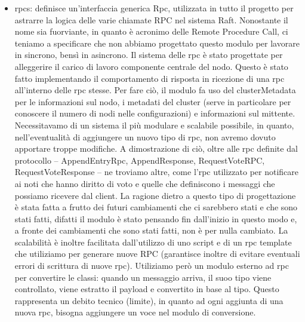 \begin{itemize}
  \item rpcs: definisce un'interfaccia generica Rpc, utilizzata in tutto il progetto per astrarre la logica delle varie chiamate RPC nel sistema Raft. Nonostante il nome sia fuorviante, in quanto è acronimo delle Remote Procedure
    Call, ci teniamo a specificare che non abbiamo progettato questo modulo per lavorare in sincrono, bensì in asincrono.
    Il sistema delle rpc è stato progettate per alleggerire il carico di lavoro
    componente centrale del nodo. Questo è stato fatto implementando il comportamento di risposta in ricezione di una rpc all'interno delle rpc stesse. Per fare ciò, il modulo fa uso del clusterMetadata 
    per le informazioni sul nodo, i metadati del cluster (serve in particolare per conoscere il numero di nodi nelle configurazioni) e informazioni sul mittente. Necessitavamo di un sistema il più modulare e scalabile possibile,
    in quanto,
    nell'eventualità di aggiungere un nuovo tipo di rpc, non avremo dovuto apportare troppe modifiche. A dimostrazione di ciò, oltre alle rpc definite dal protocollo -- AppendEntryRpc, AppendResponse, RequestVoteRPC, 
    RequestVoteResponse -- ne troviamo altre, come l'rpc utilizzato per notificare ai noti che hanno diritto di voto e quelle che definiscono i messaggi che possiamo ricevere dal client. La ragione dietro a questo tipo di 
    progettazione è stata 
    fatta a frutto dei futuri cambiamenti che ci sarebbero stati e che sono stati fatti, difatti il modulo è stato pensando fin dall'inizio in questo modo e, a fronte dei cambiamenti che sono stati fatti, non è per nulla cambiato. 
    La scalabilità è inoltre facilitata dall'utilizzo di uno script e di un rpc template che utiliziamo per generare nuove RPC (garantisce inoltre di evitare eventuali errori di scrittura di nuove rpc). 
    Utiliziamo però un modulo esterno ad rpc per convertire le classi: quando un messaggio arriva, il suoo tipo viene controllato, viene estratto il payload e convertito in base al tipo. Questo rappresenta un 
    debito tecnico (limite), in quanto ad ogni aggiunta di una nuova rpc, bisogna aggiungere un voce nel modulo di conversione. 
    

\end{itemize}
